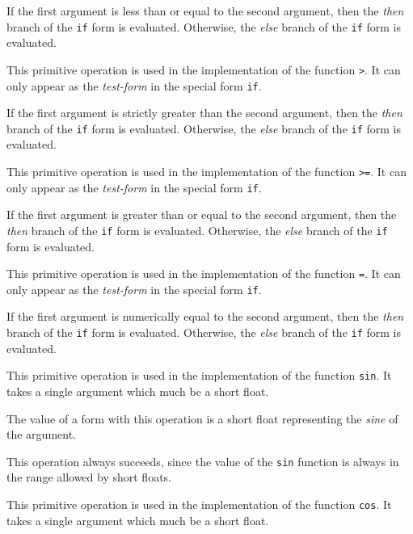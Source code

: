 If the first argument is less than or equal to the second argument,
then the \emph{then} branch of the \texttt{if} form is evaluated.
Otherwise, the \emph{else} branch of the \texttt{if} form is
evaluated.

 {}

This primitive operation is used in the implementation of the
\commonlisp{} function \texttt{>}.  \ittakesthree{} It can only appear
as the \emph{test-form} in the special form \texttt{if}.

If the first argument is strictly greater than the second argument,
then the \emph{then} branch of the \texttt{if} form is evaluated.
Otherwise, the \emph{else} branch of the \texttt{if} form is
evaluated.

 {}

This primitive operation is used in the implementation of the
\commonlisp{} function \texttt{>=}.  \ittakesthree{} It can only appear
as the \emph{test-form} in the special form \texttt{if}.

If the first argument is greater than or equal to the second argument,
then the \emph{then} branch of the \texttt{if} form is evaluated.
Otherwise, the \emph{else} branch of the \texttt{if} form is
evaluated.

 {}

This primitive operation is used in the implementation of the
\commonlisp{} function \texttt{=}.  \ittakesthree{} It can only appear
as the \emph{test-form} in the special form \texttt{if}.

If the first argument is numerically equal to the second argument,
then the \emph{then} branch of the \texttt{if} form is evaluated.
Otherwise, the \emph{else} branch of the \texttt{if} form is
evaluated.

 {}

This primitive operation is used in the implementation of the
\commonlisp{} function \texttt{sin}.  It takes a single argument which
much be a short float.

The value of a form with this operation is a short float representing
the \emph{sine} of the argument.

This operation always succeeds, since the value of the \texttt{sin}
function is always in the range allowed by short floats.

 {}

This primitive operation is used in the implementation of the
\commonlisp{} function \texttt{cos}.  It takes a single argument which
much be a short float.

